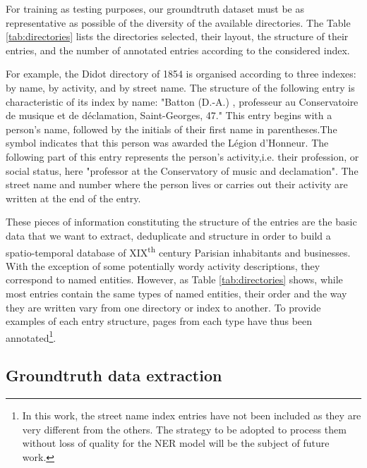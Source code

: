 For training as testing purposes, our groundtruth dataset must be as representative as possible of the diversity of the available directories. The Table \ref{tab:directories} lists the directories selected, their layout, the structure of their entries, and the number of annotated entries according to the considered index.

For example, the Didot directory of 1854 is organised according to three indexes: by name, by activity, and by street name. The structure of the following entry is characteristic of its index by name: "Batton (D.-A.) , professeur au Conservatoire de musique et de déclamation, Saint-Georges, 47." This entry begins with a person's name, followed by the initials of their first name in parentheses.The symbol indicates that this person was awarded the Légion d'Honneur. The following part of this entry represents the person's activity,i.e. their profession, or social status, here "professor at the Conservatory of music and declamation". The street name and number where the person lives or carries out their activity are written at the end of the entry.

These pieces of information constituting the structure of the entries are the basic data that we want to extract, deduplicate and structure in order to build a spatio-temporal database of XIX\textsuperscript{th} century Parisian inhabitants and businesses. With the exception of some potentially wordy activity descriptions, they correspond to named entities. However, as Table \ref{tab:directories} shows, while most entries contain the same types of named entities, their order and the way they are written vary from one directory or index to another. To provide examples of each entry structure, pages from each type have thus been annotated\footnote{In this work, the street name index entries have not been included as they are very different from the others. The strategy to be adopted to process them without loss of quality for the NER model will be the subject of future work.}.


\subsection{Groundtruth data extraction}

